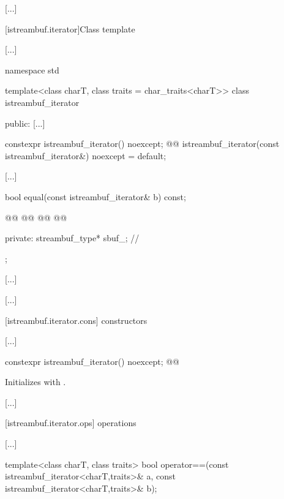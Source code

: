[...]

[istreambuf.iterator]{Class template }

[...]

%
\begin{codeblock}
namespace std {
  template<class charT, class traits = char_traits<charT>>
  class istreambuf_iterator {
  public:
    [...]

    constexpr istreambuf_iterator() noexcept;
    @@
    istreambuf_iterator(const istreambuf_iterator&) noexcept = default;

    [...]

    bool equal(const istreambuf_iterator& b) const;

    @@
    @@
    @@
    @@

  private:
    streambuf_type* sbuf_;                // \expos
  };

  [...]
}
\end{codeblock}

[...]

\setcounter{subsubsection}{1}
[istreambuf.iterator.cons]{ constructors}

[...]

\setcounter{Paras}{1}
%
\begin{itemdecl}
constexpr istreambuf_iterator() noexcept;
@@
\end{itemdecl}

\begin{itemdescr}
\pnum
\effects
Initializes  with .
\end{itemdescr}

[...]

[istreambuf.iterator.ops]{ operations}

[...]

\setcounter{Paras}{5}
%
\begin{itemdecl}
template<class charT, class traits>
  bool operator==(const istreambuf_iterator<charT,traits>& a,
                  const istreambuf_iterator<charT,traits>& b);
\end{itemdecl}

